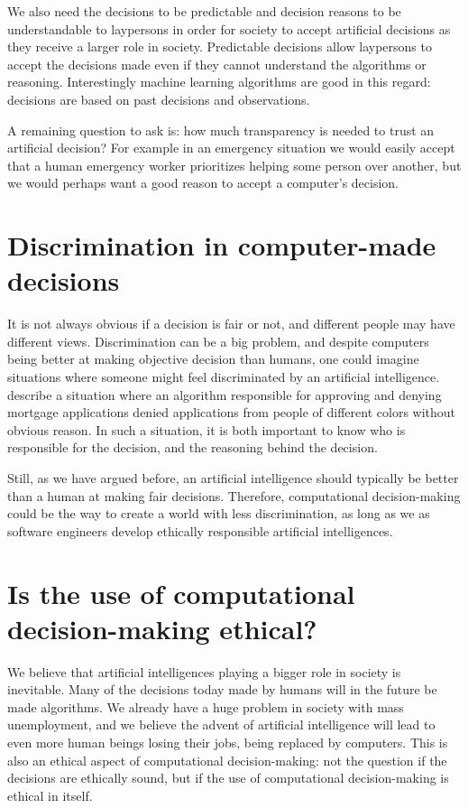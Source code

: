\documentclass[11pt]{article}
\begin{document}
We also need the decisions to be predictable and decision reasons to
be understandable to laypersons in order for society to accept
artificial decisions as they receive a larger role in
society. Predictable decisions allow laypersons to accept the
decisions made even if they cannot understand the algorithms or
reasoning. Interestingly machine learning algorithms are good in this
regard: decisions are based on past decisions and observations.

A remaining question to ask is: how much transparency is needed to
trust an artificial decision? For example in an emergency situation we
would easily accept that a human emergency worker prioritizes helping
some person over another, but we would perhaps want a good reason to
accept a computer's decision.

\section{Discrimination in computer-made decisions}

It is not always obvious if a decision is fair or not, and different people may have
different views. Discrimination can be a big problem, and despite computers being better at making
objective decision than humans, one could imagine situations where someone might feel discriminated by 
an artificial intelligence. \citeauthor{bostrom2013ethics} describe a situation where an algorithm 
responsible for approving and denying mortgage applications denied applications from people of different colors without obvious reason.
In such a situation, it is both important to know who is responsible for the decision, and the reasoning 
behind the decision.

Still, as we have argued before, an artificial intelligence should typically be better than a 
human at making fair decisions. Therefore, computational decision-making could be the way to create
a world with less discrimination, as long as we as software engineers develop ethically responsible 
artificial intelligences.

\section{Is the use of computational decision-making ethical?}

We believe that artificial intelligences playing a bigger role in society is inevitable. Many of the
decisions today made by humans will in the future be made algorithms. We already have a huge problem
in society with mass unemployment, and we believe the advent of artificial intelligence will lead to
even more human beings losing their jobs, being replaced by computers. This is also an ethical 
aspect of computational decision-making: not the question if the decisions are ethically sound, but if the
use of computational decision-making is ethical in itself.
\end{document}
